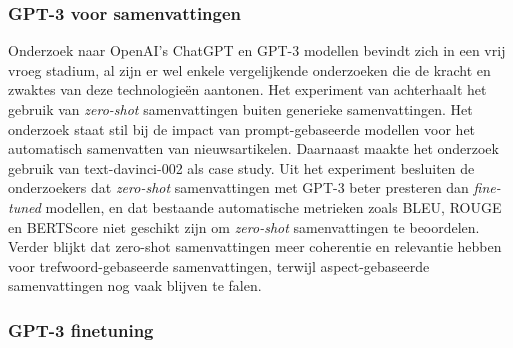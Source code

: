 

\subsubsection{GPT-3 voor samenvattingen}




Onderzoek naar OpenAI's ChatGPT en GPT-3 modellen bevindt zich in een vrij vroeg stadium, al zijn er wel enkele vergelijkende onderzoeken die de kracht en zwaktes van deze technologieën aantonen. Het experiment van \textcite{Goyal2022} achterhaalt het gebruik van \textit{zero-shot} samenvattingen buiten generieke samenvattingen. Het onderzoek staat stil bij de impact van prompt-gebaseerde modellen voor het automatisch samenvatten van nieuwsartikelen. Daarnaast maakte het onderzoek gebruik van text-davinci-002 als case study. Uit het experiment besluiten de onderzoekers dat \textit{zero-shot} samenvattingen met GPT-3 beter presteren dan \textit{fine-tuned} modellen, en dat bestaande automatische metrieken zoals BLEU, ROUGE en BERTScore niet geschikt zijn om \textit{zero-shot} samenvattingen te beoordelen. Verder blijkt dat zero-shot samenvattingen meer coherentie en relevantie hebben voor trefwoord-gebaseerde samenvattingen, terwijl aspect-gebaseerde samenvattingen nog vaak blijven te falen.


\subsubsection{GPT-3 finetuning}

